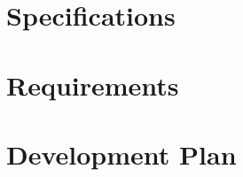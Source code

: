 \documentclass[12pt]{article}
\begin{document}
\maketitle
\tableofcontents
\pagebreak

\section{Specifications}


\section{Requirements}

\section{Development Plan}
\end{document}
